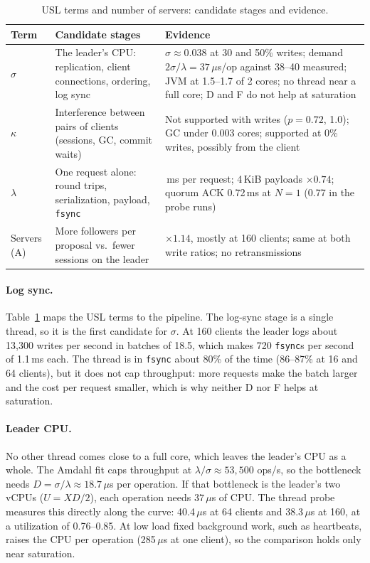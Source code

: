 \documentclass{llncs}
\begin{document}
\begin{table}[t]
  \centering
  \caption{USL terms and number of servers: candidate stages and evidence.}
  \label{tab:limits}
  \scriptsize
  \begin{tabularx}{\linewidth}{@{}>{\raggedright\arraybackslash}p{1.1cm}>{\raggedright\arraybackslash}p{3.6cm}>{\raggedright\arraybackslash}X@{}}
    \toprule
    Term & Candidate stages & Evidence \\
    \midrule
    $\sigma$ & The leader's CPU: replication, client connections, ordering, log sync
      & $\sigma\approx0.038$ at 30 and 50\% writes; demand $2\sigma/\lambda=37\,\mu$s/op against 38--40 measured; JVM at
        1.5--1.7 of 2 cores; no thread near a full core; D and F do not help at saturation \\
    $\kappa$ & Interference between pairs of clients (sessions, GC, commit waits)
      & Not supported with writes ($p=0.72$, 1.0); GC under 0.003 cores; supported at 0\% writes, possibly from the client \\
    $\lambda$ & One request alone: round trips, serialization, payload, \texttt{fsync}
      & 0.48\,ms per request; 4\,KiB payloads $\times0.74$; quorum ACK 0.72\,ms at $N=1$ (0.77 in the probe runs) \\
    Servers (A) & More followers per proposal vs.\ fewer sessions on the leader
      & $\times1.14$, mostly at 160 clients; same at both write ratios; no retransmissions \\
    \bottomrule
  \end{tabularx}
\end{table}

\paragraph{Log sync.} Table~\ref{tab:limits} maps the USL terms to the pipeline. The log-sync stage is a single thread, so it is the first candidate for $\sigma$. At 160 clients the leader logs about 13{,}300 writes per second in batches of 18.5, which makes 720 \texttt{fsync}s per second of 1.1\,ms each. The thread is in \texttt{fsync} about 80\% of the time (86--87\% at 16 and 64 clients), but it does not cap throughput: more requests make the batch larger and the cost per request smaller, which is why neither D nor F helps at saturation.

\paragraph{Leader CPU.} No other thread comes close to a full core, which leaves the leader's CPU as a whole. The Amdahl fit caps throughput at $\lambda/\sigma\approx53{,}500$ ops/s, so the bottleneck needs $D=\sigma/\lambda\approx18.7\,\mu$s per operation. If that bottleneck is the leader's two vCPUs ($U=XD/2$), each operation needs $37\,\mu$s of CPU. The thread probe measures this directly along the curve: 40.4\,$\mu$s at 64 clients and 38.3\,$\mu$s at 160, at a utilization of 0.76--0.85. At low load fixed background work, such as heartbeats, raises the CPU per operation (285\,$\mu$s at one client), so the comparison holds only near saturation.
\end{document}
